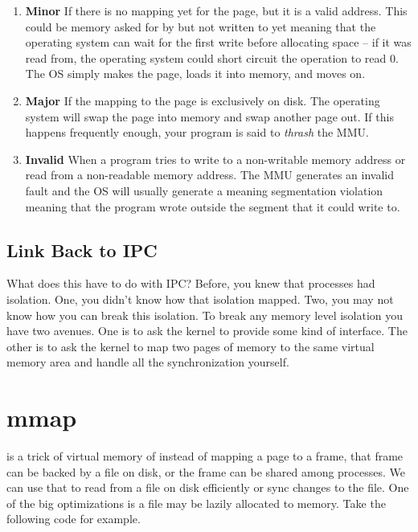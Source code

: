 \begin{enumerate}
	\item \textbf{Minor} If there is no mapping yet for the page, but it is a valid address.
	      This could be memory asked for by  but not written to yet meaning that the operating system can wait for the first write before allocating space -- if it was read from, the operating system could short circuit the operation to read 0.
	      The OS simply makes the page, loads it into memory, and moves on.
	      	 
	\item \textbf{Major} If the mapping to the page is exclusively on disk.
	      The operating system will swap the page into memory and swap another page out.
	      If this happens frequently enough, your program is said to \emph{thrash} the MMU.
	      	 
	\item \textbf{Invalid} When a program tries to write to a non-writable memory address or read from a non-readable memory address.
	      The MMU generates an invalid fault and the OS will usually generate a  meaning segmentation violation meaning that the program wrote outside the segment that it could write to.
	      	 
\end{enumerate}
	 
\subsection{Link Back to IPC}
	 
What does this have to do with IPC?
Before, you knew that processes had isolation.
One, you didn't know how that isolation mapped.
Two, you may not know how you can break this isolation.
To break any memory level isolation you have two avenues.
One is to ask the kernel to provide some kind of interface.
The other is to ask the kernel to map two pages of memory to the same virtual memory area and handle all the synchronization yourself.
	 
\section{mmap}
	 
 is a trick of virtual memory of instead of mapping a page to a frame, that frame can be backed by a file on disk, or the frame can be shared among processes.
We can use that to read from a file on disk efficiently or sync changes to the file.
One of the big optimizations is a file may be lazily allocated to memory.
Take the following code for example.
	 
